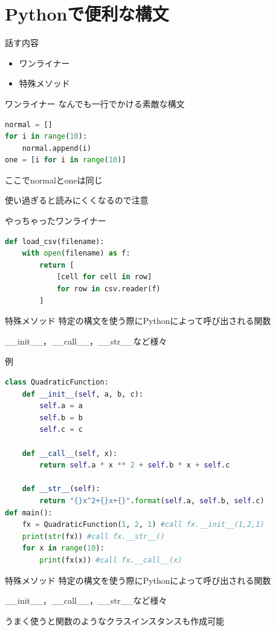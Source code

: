 \documentclass[12pt, dvipdfmx]{beamer}
\begin{document}
\section{Pythonで便利な構文}
\begin{frame}{話す内容}
    \begin{itemize}
        \item ワンライナー
        \item 特殊メソッド
    \end{itemize}
\end{frame}
\begin{frame}[fragile]{ワンライナー}
    なんでも一行でかける素敵な構文

\begin{lstlisting}[language=Python,basicstyle=\ttfamily, keywordstyle=\color{blue}\ttfamily, stringstyle=\color{red}]
normal = []
for i in range(10):
    normal.append(i)
one = [i for i in range(10)]
\end{lstlisting}

    ここでnormalとoneは同じ

    \alert{使い過ぎると読みにくくなるので注意}
\end{frame}
\begin{frame}[fragile]{やっちゃったワンライナー}
\begin{lstlisting}[language=Python,basicstyle=\ttfamily, keywordstyle=\color{blue}\ttfamily, stringstyle=\color{red},caption={wrong\_onelinear.py},captionpos=t]
def load_csv(filename):
    with open(filename) as f:
        return [
            [cell for cell in row]
            for row in csv.reader(f)
        ]
\end{lstlisting}
\end{frame}
\begin{frame}{特殊メソッド}
    特定の構文を使う際にPythonによって呼び出される関数

    \_\_init\_\_，\_\_call\_\_，\_\_str\_\_など様々
\end{frame}
\begin{frame}[fragile]{例}
\begin{lstlisting}[language=Python,basicstyle=\scriptsize\ttfamily, keywordstyle=\color{blue}\ttfamily, stringstyle=\color{red}, commentstyle=\color{green},caption={special\_method.py},captionpos=t]
class QuadraticFunction:
    def __init__(self, a, b, c):
        self.a = a
        self.b = b
        self.c = c

    def __call__(self, x):
        return self.a * x ** 2 + self.b * x + self.c

    def __str__(self):
        return "{}x^2+{}x+{}".format(self.a, self.b, self.c)
def main():
    fx = QuadraticFunction(1, 2, 1) #call fx.__init__(1,2,1)
    print(str(fx)) #call fx.__str__()
    for x in range(10):
        print(fx(x)) #call fx.__call__(x)
\end{lstlisting}
\end{frame}
\begin{frame}{特殊メソッド}
    特定の構文を使う際にPythonによって呼び出される関数

    \_\_init\_\_，\_\_call\_\_，\_\_str\_\_など様々

    うまく使うと関数のようなクラスインスタンスも作成可能
\end{frame}
\end{document}
